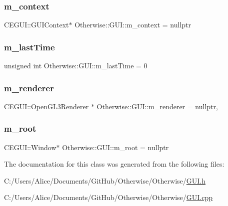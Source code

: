\subsubsection{\texorpdfstring{m\+\_\+context}{m\_context}}
{\footnotesize\ttfamily C\+E\+G\+U\+I\+::\+G\+U\+I\+Context$\ast$ Otherwise\+::\+G\+U\+I\+::m\+\_\+context = nullptr\hspace{0.3cm}{\ttfamily [private]}}

\mbox{\label{class_otherwise_1_1_g_u_i_a2ca71b9f19ec83ea95a0401bb020a895}} 
\subsubsection{\texorpdfstring{m\+\_\+last\+Time}{m\_lastTime}}
{\footnotesize\ttfamily unsigned int Otherwise\+::\+G\+U\+I\+::m\+\_\+last\+Time = 0\hspace{0.3cm}{\ttfamily [private]}}

\mbox{\label{class_otherwise_1_1_g_u_i_ac8ab7faa598219a9134e2841f142afbd}} 
\subsubsection{\texorpdfstring{m\+\_\+renderer}{m\_renderer}}
{\footnotesize\ttfamily C\+E\+G\+U\+I\+::\+Open\+G\+L3\+Renderer $\ast$ Otherwise\+::\+G\+U\+I\+::m\+\_\+renderer = nullptr\hspace{0.3cm}{\ttfamily [static]}, {\ttfamily [private]}}

\mbox{\label{class_otherwise_1_1_g_u_i_a913d15fe9ed784b2291d6b4c642e09a2}} 
\subsubsection{\texorpdfstring{m\+\_\+root}{m\_root}}
{\footnotesize\ttfamily C\+E\+G\+U\+I\+::\+Window$\ast$ Otherwise\+::\+G\+U\+I\+::m\+\_\+root = nullptr\hspace{0.3cm}{\ttfamily [private]}}



The documentation for this class was generated from the following files\+:\begin{DoxyCompactItemize}
\item 
C\+:/\+Users/\+Alice/\+Documents/\+Git\+Hub/\+Otherwise/\+Otherwise/\hyperlink{_g_u_i_8h}{G\+U\+I.\+h}\item 
C\+:/\+Users/\+Alice/\+Documents/\+Git\+Hub/\+Otherwise/\+Otherwise/\hyperlink{_g_u_i_8cpp}{G\+U\+I.\+cpp}\end{DoxyCompactItemize}
